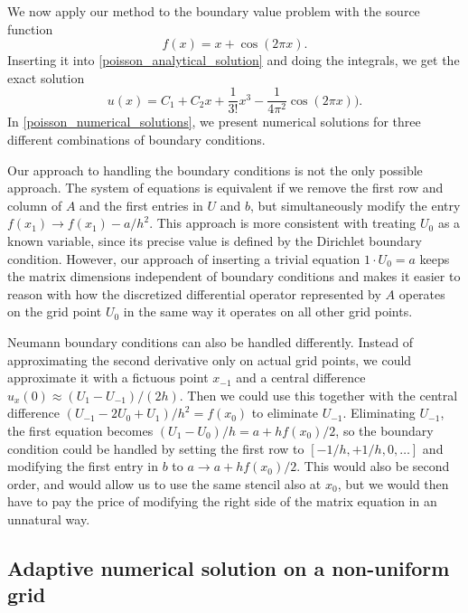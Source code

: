 We now apply our method to the boundary value problem with the source function 
\begin{equation*}
f(x) = x + \cos(2 \pi x).
\end{equation*}
Inserting it into \cref{poisson_analytical_solution} and doing the integrals, we get the exact solution
\begin{equation*}
u(x) = C_1 + C_2 x + \frac{1}{3!}x^3 - \frac{1}{4 \pi^2}\cos(2 \pi x)).
\end{equation*}
In \cref{poisson_numerical_solutions}, we present numerical solutions for three different combinations of boundary conditions.

Our approach to handling the boundary conditions is not the only possible approach.
The system of equations is equivalent if we remove the first row and column of $A$ and the first entries in $U$ and $b$, but simultaneously modify the entry $f(x_1) \rightarrow f(x_1) - a/h^2$.
This approach is more consistent with treating $U_0$ as a known variable, since its precise value is defined by the Dirichlet boundary condition.
However, our approach of inserting a trivial equation $1 \cdot U_0 = a$ keeps the matrix dimensions independent of boundary conditions and makes it easier to reason with how the discretized differential operator represented by $A$ operates on the grid point $U_0$ in the same way it operates on all other grid points.

Neumann boundary conditions can also be handled differently.
Instead of approximating the second derivative only on actual grid points, we could approximate it with a fictuous point $x_{-1}$ and a central difference $u_x(0) \approx (U_1 - U_{-1}) / (2 h)$.
Then we could use this together with the central difference $(U_{-1} - 2 U_0 + U_1) / h^2 = f(x_0)$ to eliminate $U_{-1}$.
Eliminating $U_{-1}$, the first equation becomes $(U_1 - U_0) / h = a + h f(x_0) / 2$, so the boundary condition could be handled by setting the first row to $[-1/h, +1/h, 0, \dots]$ and modifying the first entry in $b$ to $a \rightarrow a + h f(x_0) / 2$.
This would also be second order, and would allow us to use the same stencil also at $x_0$, but we would then have to pay the price of modifying the right side of the matrix equation in an unnatural way.

\subsection{Adaptive numerical solution on a non-uniform grid}

